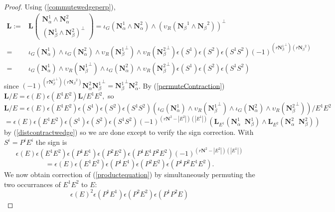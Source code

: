 \documentclass[Unicode]{cedram-alco}
\newcommand{\ext}[1]{\ensuremath{\mathbf{#1}}}
\newcommand{\Is}{\ensuremath{\iota}}
\newcommand{\Vs}{\ensuremath{\upsilon}}
\newcommand{\LHorSub}[3]{\ext{L}_{#1}\left(  {#2}\;\; {#3}  \right)}
\begin{document}
\begin{proof}

Using (\ref{commutewedgeperp}),
\begin{equation*}
  \begin{split}
    \ext{L} := & \ext{L}\left(
    \begin{array}{c}
      \ext{N}^{1}_\alpha\wedge \ext{N}^{2}_\alpha
      \\     
      (\ext{N}^{1}_\beta\wedge\ext{N}^{2}_\beta)^\perp
    \end{array} \right)
  =\Is_G(\ext{N}_\alpha^{1}\wedge \ext{N}_\alpha^{2})
  \wedge\left(\Vs_R({\ext{N}_\beta}^{1}\wedge{\ext{N}_\beta}^{2})\right)^\perp
  \\
  =&
  \Is_G(\ext{N}_\alpha^{1})\wedge \Is_G(\ext{N}_\alpha^{2})
  \wedge\Vs_R({\ext{N}_\beta^{1}}^\perp)\wedge\Vs_R({\ext{N}_\beta^{2}}^\perp)
  \epsilon(S^{1})\epsilon(S^{2})\epsilon(S^{1}S^{2})(-1)^{(r{\ext{N}_\beta^{1}}^\perp)( r{\ext{N}_\beta}^{2})}
  \\
  =& 
    \Is_G(\ext{N}_\alpha^{1}) \wedge \Vs_R({\ext{N}_\beta^{1}}^\perp) \wedge
    \Is_G(\ext{N}_\alpha^{2}) \wedge \Vs_R({\ext{N}_\beta^{2}}^\perp)
    \epsilon(S^{1})\epsilon(S^{2})\epsilon(S^{1}S^{2})
  \end{split}
\end{equation*}
since $(-1)^{(r{\ext{N}_\beta^{1}}^\perp)( r{\ext{N}_\beta}^{2})} \ext{N}_\alpha^{2} {\ext{N}_\beta^{1}}^\perp
={\ext{N}_\beta^{1}}^\perp \ext{N}_\alpha^{2}$.  By (\ref{permuteContraction})
$
\ext{L}/E = \epsilon(E)\epsilon(E^{1} E^{2})\ext{L}/E^{1}E^{2},
$ so
\[
\ext{L}/E = \epsilon(E)\epsilon(E^{1} E^{2})\epsilon(S^{1})\epsilon(S^{2})\epsilon(S^{1}S^{2})
\left(
 \Is_G(\ext{N}_\alpha^{1}) \wedge \Vs_R({\ext{N}_\beta^{1}}^\perp) \wedge
    \Is_G(\ext{N}_\alpha^{2}) \wedge \Vs_R({\ext{N}_\beta^{2}}^\perp)
\right)/E^1E^2
\]
\[
=\epsilon(E)\epsilon(E^{1} E^{2})\epsilon(S^{1})\epsilon(S^{2})\epsilon(S^{1}S^{2})
(-1)^{(r\ext{N}^2-|E^2|)(|E^1|)}
\left(\LHorSub{E^{1}}{\ext{N}_\alpha^{1}}{\ext{N}_\beta^{1}}
        \wedge
        \LHorSub{E^{2}}{\ext{N}_\alpha^{2}}{\ext{N}_\beta^{2}}
          \right)
          \]
by (\ref{distcontractwedge}) so we are done except to verify the sign correction.  With $S^i=P^iE^i$ the sign is
\[
\epsilon(E)\epsilon(E^{1} E^{2})\epsilon(P^1E^1)\epsilon(P^{2}E^2)\epsilon(P^1E^1P^2E^2)
(-1)^{(r\ext{N}^2-|E^2|)(|E^1|)}
\]
\[
=\epsilon(E)\epsilon(E^{1} E^{2})\epsilon(P^1E^1)\epsilon(P^{2}E^2)\epsilon(P^1P^2E^1E^2).
\]
We now obtain correction of (\ref{productequation}) by simultaneously permuting the two occurrances of $E^1E^2$
to $E$:
\[
\epsilon(E)^2\epsilon(P^1E^1)\epsilon(P^{2}E^2)\epsilon(P^1P^2E)
\]



\end{proof}
\end{document}

